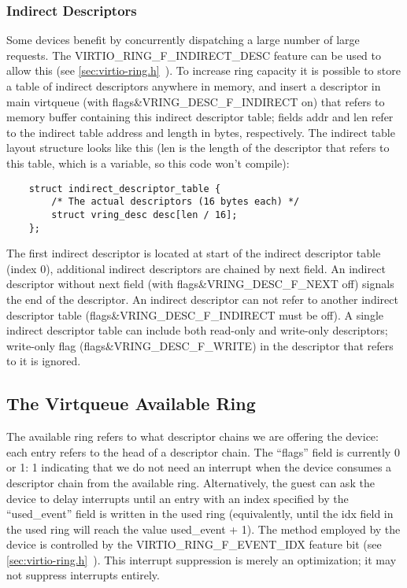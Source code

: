 \subsubsection{Indirect Descriptors}\label{sec:Basic Facilities of a Virtio Device / Virtqueues / The Virtqueue Descriptor Table / Indirect Descriptors}

Some devices benefit by concurrently dispatching a large number
of large requests. The VIRTIO_RING_F_INDIRECT_DESC feature can be
used to allow this (see \ref{sec:virtio-ring.h}~). To increase
ring capacity it is possible to store a table of indirect
descriptors anywhere in memory, and insert a descriptor in main
virtqueue (with flags\&VRING_DESC_F_INDIRECT on) that refers to memory buffer
containing this indirect descriptor table; fields addr and len
refer to the indirect table address and length in bytes,
respectively. The indirect table layout structure looks like this
(len is the length of the descriptor that refers to this table,
which is a variable, so this code won't compile):

\begin{lstlisting}
	struct indirect_descriptor_table {
		/* The actual descriptors (16 bytes each) */
		struct vring_desc desc[len / 16];
	};
\end{lstlisting}

The first indirect descriptor is located at start of the indirect
descriptor table (index 0), additional indirect descriptors are
chained by next field. An indirect descriptor without next field
(with flags\&VRING_DESC_F_NEXT off) signals the end of the descriptor.
An
indirect descriptor can not refer to another indirect descriptor
table (flags\&VRING_DESC_F_INDIRECT must be off). A single indirect descriptor
table can include both read-only and write-only descriptors;
write-only flag (flags\&VRING_DESC_F_WRITE) in the descriptor that refers to it
is ignored.

\subsection{The Virtqueue Available Ring}\label{sec:Basic Facilities of a Virtio Device / Virtqueues / The Virtqueue Available Ring}

The available ring refers to what descriptor chains we are offering the
device: each entry refers to the head of a descriptor chain. The “flags” field
is currently 0 or 1: 1 indicating that we do not need an interrupt
when the device consumes a descriptor chain from the available
ring. Alternatively, the guest can ask the device to delay interrupts
until an entry with an index specified by the “used_event” field is
written in the used ring (equivalently, until the idx field in the
used ring will reach the value used_event + 1). The method employed by
the device is controlled by the VIRTIO_RING_F_EVENT_IDX feature bit
(see \ref{sec:virtio-ring.h}~). This interrupt suppression is
merely an optimization; it may not suppress interrupts entirely.

